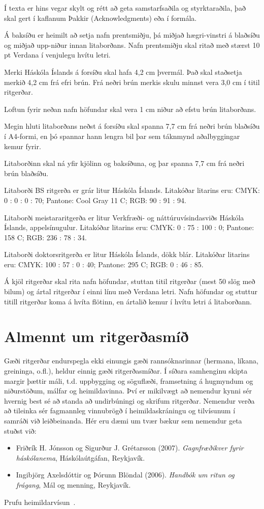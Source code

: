 \documentclass[a4paper,12pt,twoside,BCOR=10mm]{scrbook}
\begin{document}
Í texta er hins vegar skylt og rétt að geta samstarfsaðila og styrktaraðila, það skal gert í kaflanum Þakkir (Acknowledgments) eða í formála.

Á baksíðu er heimilt að setja nafn prentsmiðju, þá miðjað hægri-vinstri á blaðsíðu og miðjað upp-niður innan litaborðans. Nafn prentsmiðju skal ritað með stærst 10 pt Verdana í venjulegu hvítu letri.

Merki Háskóla Íslands á forsíðu skal hafa 4,2 cm þvermál. Það skal staðsetja merkið 4,2 cm frá efri brún. Frá neðri brún merkis skulu minnst vera 3,0 cm í titil ritgerðar.

Loftun fyrir neðan nafn höfundar skal vera 1 cm niður að efstu brún litaborðans.

Megin hluti litaborðans neðst á forsíðu skal spanna 7,7 cm frá neðri brún blaðsíðu í A4-formi, en þó spannar hann lengra bil þar sem táknmynd aðalbyggingar kemur fyrir.

Litaborðinn skal ná yfir kjölinn og baksíðuna, og þar spanna 7,7 cm frá neðri brún blaðsíðu.

Litaborði BS ritgerða er grár litur Háskóla Íslands. Litakóðar litarins eru: CMYK: 0 : 0 : 0 : 70; Pantone: Cool Gray 11 C; RGB: 90 : 91 : 94.

Litaborði meistararitgerða er litur Verkfræði- og náttúruvísindasviðs Háskóla Íslands, appelsínugulur. Litakóðar litarins eru: CMYK:  0 : 75 : 100 : 0; Pantone: 158 C; RGB: 236 : 78 : 34.

Litaborði doktorsritgerða er litur Háskóla Íslands, dökk blár. Litakóðar litarins eru: CMYK: 100 : 57 : 0 : 40; Pantone: 295 C; RGB: 0 : 46 : 85.

Á kjöl ritgerðar skal rita nafn höfundar, stuttan titil ritgerðar (mest 50 slög með bilum) og ártal ritgerðar í einni línu með Verdana letri. Nafn höfundar og stuttur titill ritgerðar koma á hvíta flötinn, en ártalið kemur í hvítu letri á litaborðann.

\section{Almennt um ritgerðasmíð}
Gæði ritgerðar endurspegla ekki einungis gæði rannsóknarinnar (hermana, líkana, greininga, o.fl.), heldur einnig gæði ritgerðasmíðar. Í síðara samhenginu skipta margir þættir máli, t.d. uppbygging og söguflæði, framsetning á hugmyndum og niðurstöðum, málfar og heimildavinna. Því er mikilvægt að nemendur kynni sér hvernig best sé að standa að undirbúningi og skrifum ritgerðar. Nemendur verða að tileinka sér fagmannleg vinnubrögð í heimildaskráningu og tilvísunum í samráði við leiðbeinanda. Hér eru dæmi um tvær bækur sem nemendur geta stuðst við:
\begin{itemize}
 \item Friðrík H. Jónsson og Sigurður J. Grétarsson (2007). \textit{Gagnfræðikver fyrir háskólanema}, Háskólaútgáfan, Reykjavík.
 \item Ingibjörg Axelsdóttir og Þórunn Blöndal (2006).  \textit{Handbók um ritun og frágang},  Mál og menning, Reykjavík.
\end{itemize}
Prufu heimildarvísun~\cite{knuth-fa}.
\end{document}
